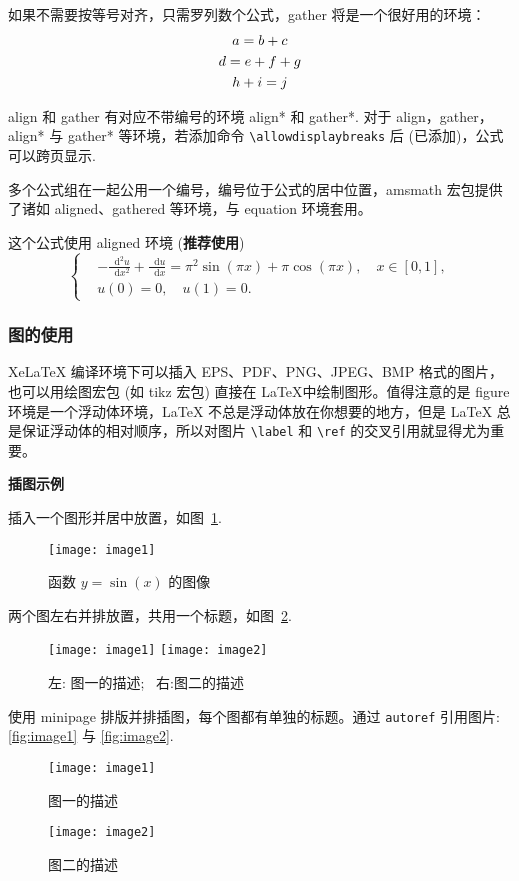 \documentclass[GP]{nsfc}
\newcommand*{\dif}{\mathop{}\!\mathrm{d}}
\begin{document}
如果不需要按等号对齐，只需罗列数个公式，gather 将是一个很好用的环境：
\begin{gather}
a = b + c \\
d = e + f + g \notag \\
h + i = j
\end{gather}

align 和 gather 有对应不带编号的环境 align* 和 gather*.
对于 align，gather，align* 与 gather* 等环境，若添加命令 \verb|\allowdisplaybreaks| 后 (已添加)，公式可以跨页显示.

多个公式组在一起公用一个编号，编号位于公式的居中位置，amsmath 宏包提供了诸如 aligned、gathered 等环境，与 equation 环境套用。

这个公式使用 aligned 环境 (\textbf{推荐使用})
\begin{equation}\label{eq:alignedEq}
\left\{\begin{aligned}
  &-\frac{{\dif}^{2} u}{\dif x^{2}}+\frac{\dif u}{\dif x}=\pi^{2} \sin (\pi x)+\pi \cos (\pi x),\quad x \in [0,1], \\
  &u(0)=0,\quad u(1)=0.
\end{aligned} \right.
\end{equation}

\subsubsection{图的使用}

XeLaTeX 编译环境下可以插入 EPS、PDF、PNG、JPEG、BMP 格式的图片，也可以用绘图宏包 (如 tikz 宏包) 直接在 \LaTeX 中绘制图形。值得注意的是 figure 环境是一个浮动体环境，LaTeX 不总是浮动体放在你想要的地方，但是 LaTeX 总是保证浮动体的相对顺序，所以对图片 \verb|\label| 和 \verb|\ref| 的交叉引用就显得尤为重要。

\textbf{插图示例}

插入一个图形并居中放置，如图~\ref{fig:sinx}.
\begin{figure}[htp!]
\centering
\texttt{[image: image1]}
\caption{函数 $y=\sin(x)$ 的图像}\label{fig:sinx}
\end{figure}

两个图左右并排放置，共用一个标题，如图~\ref{fig:image}.
\begin{figure}[htp!]
\centering
\texttt{[image: image1]}
\hfill
\texttt{[image: image2]}
\caption{左: 图一的描述;~ 右:图二的描述}
\label{fig:image}
\end{figure}

使用 minipage 排版并排插图，每个图都有单独的标题。通过 \verb|autoref| 引用图片: \autoref{fig:image1} 与 \autoref{fig:image2}.
\begin{figure}[htp!]
\begin{minipage}[t]{0.48\linewidth}
\centering
\texttt{[image: image1]}
\caption{图一的描述}
\label{fig:image1}
\end{minipage}
\hfill
\begin{minipage}[t]{0.48\linewidth}
\centering
\texttt{[image: image2]}
\caption{图二的描述}
\label{fig:image2}
\end{minipage}
\end{figure}
\end{document}
